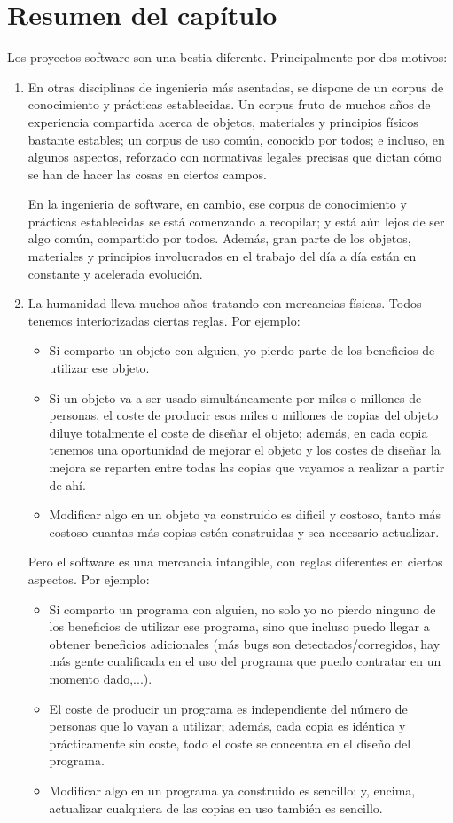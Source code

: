 \documentclass[spanish,12pt,a4paper,final,oneside]{book}
\begin{document}
\section*{Resumen del capítulo}
Los proyectos software son una bestia diferente. Principalmente por dos motivos:
\begin{enumerate}
\item En otras disciplinas de ingenieria más asentadas, se dispone de un corpus de conocimiento y prácticas establecidas. Un corpus fruto de muchos años de experiencia compartida acerca de objetos, materiales y principios físicos bastante estables; un corpus de uso común, conocido por todos; e incluso, en algunos aspectos, reforzado con normativas legales precisas que dictan cómo se han de hacer las cosas en ciertos campos. 

En la ingenieria de software, en cambio, ese corpus de conocimiento y prácticas establecidas se está comenzando a recopilar; y está aún lejos de ser algo común, compartido por todos. Además, gran parte de los objetos, materiales y principios involucrados en el trabajo del día a día están en constante y acelerada evolución.

\item La humanidad lleva muchos años tratando con mercancias físicas. Todos tenemos interiorizadas ciertas reglas. Por ejemplo: 
\begin{itemize}
\item Si comparto un objeto con alguien, yo pierdo parte de los beneficios de utilizar ese objeto. 
\item Si un objeto va a ser usado simultáneamente por miles o millones de personas, el coste de producir esos miles o millones de copias del objeto diluye totalmente el coste de diseñar el objeto; además, en cada copia tenemos una oportunidad de mejorar el objeto y los costes de diseñar la mejora se reparten entre todas las copias que vayamos a realizar a partir de ahí.
\item Modificar algo en un objeto ya construido es dificil y costoso, tanto más costoso cuantas más copias estén construidas y sea necesario actualizar.
\end{itemize}
Pero el software es una mercancia intangible, con reglas diferentes en ciertos aspectos. Por ejemplo: 
\begin{itemize}
\item Si comparto un programa con alguien, no solo yo no pierdo ninguno de los beneficios de utilizar ese programa, sino que incluso puedo llegar a obtener beneficios adicionales (más bugs son detectados/corregidos, hay más gente cualificada en el uso del programa que puedo contratar en un momento dado,...). 
\item El coste de producir un programa es independiente del número de personas que lo vayan a utilizar; además, cada copia es idéntica y prácticamente sin coste, todo el coste se concentra en el diseño del programa.
\item Modificar algo en un programa ya construido es sencillo; y, encima, actualizar cualquiera de las copias en uso también es sencillo.
\end{itemize}
\end{enumerate}
\end{document}
